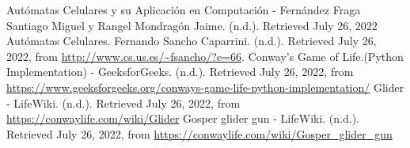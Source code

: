 \documentclass[a4paper,12pt]{article}
\begin{document}
\begin{thebibliography}{6}
     Autómatas Celulares y su Aplicación en Computación - Fernández Fraga Santiago Miguel y Rangel Mondragón Jaime. (n.d.). Retrieved July 26, 2022
     Autómatas Celulares. Fernando Sancho Caparrini. (n.d.). Retrieved July 26, 2022, from \url{http://www.cs.us.es/~fsancho/?e=66}.
     Conway's Game of Life.(Python Implementation) - GeeksforGeeks. (n.d.). Retrieved July 26, 2022, from \url{https://www.geeksforgeeks.org/conways-game-life-python-implementation/}
     Glider - LifeWiki. (n.d.). Retrieved July 26, 2022, from \url{https://conwaylife.com/wiki/Glider}
    Gosper glider gun - LifeWiki. (n.d.). Retrieved July 26, 2022, from \url{https://conwaylife.com/wiki/Gosper_glider_gun}
\end{thebibliography}
\end{document}
